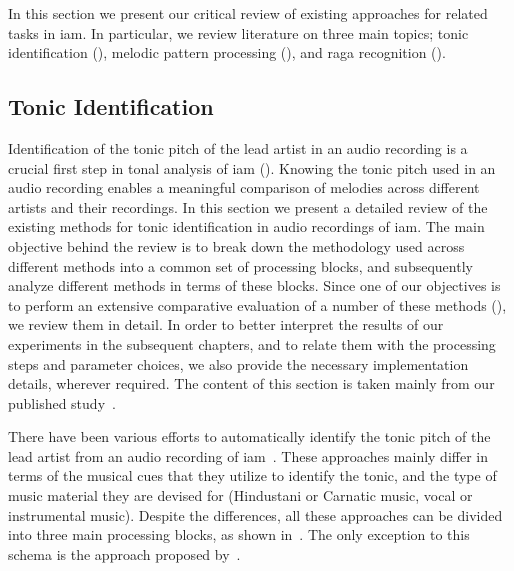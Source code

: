 In this section we present our critical review of existing approaches for related tasks in \gls{iam}. In particular, we review literature on three main topics; tonic identification (), melodic pattern processing (), and  \gls{raga} recognition ().  


\subsection{Tonic Identification}
\label{sec:background_relevant_work_tonic_identification}

Identification of the tonic pitch of the lead artist in an audio recording is a crucial first step in tonal analysis of \gls{iam} (). Knowing the tonic pitch used in an audio recording enables a meaningful comparison of melodies across different artists and their recordings. In this section we present a detailed review of the existing methods for tonic identification in audio recordings of \gls{iam}. The main objective behind the review is to break down the methodology used across different methods into a common set of processing blocks, and subsequently analyze different methods in terms of these blocks. Since one of our objectives is to perform an extensive comparative evaluation of a number of these methods (), we review them in detail. In order to better interpret the results of our experiments in the subsequent chapters, and to relate them with the processing steps and parameter choices, we also provide the necessary implementation details, wherever required. The content of this section is taken mainly from our published study~\citep{Gulati2014Tonic}.

There have been various efforts to automatically identify the tonic pitch of the lead artist from an audio recording of \gls{iam}~\citep{salamon2012multipitch,gulati2012two,bellur2012knowledge,ranjani2011carnatic,Sengupta2005b,chordia2013joint}. These approaches mainly differ in terms of the musical cues that they utilize to identify the tonic, and the type of music material they are devised for (Hindustani or Carnatic music, vocal or
instrumental music). Despite the differences, all these approaches can be divided into three main processing blocks, as shown in~. The only exception to this schema is the approach proposed by~\cite{Sengupta2005b}. 

